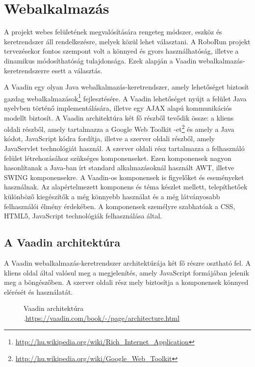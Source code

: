\section{Webalkalmazás}\label{sec:Vaadin}

	A projekt webes felületének megvalósítására rengeteg módszer, eszköz és keretrendszer áll rendelkezésre, melyek közül lehet választani. A RoboRun projekt tervezésekor fontos szempont volt a könnyed és gyors használhatóság, illetve a dinamikus módosíthatóság tulajdonsága. Ezek alapján a Vaadin webalkalmazás-keretrendszerre esett a választás.
	
	A Vaadin egy olyan Java webalkalmazás-keretrendszer, amely lehetőséget biztosít gazdag webalkalmazások\footnote{\href {http://hu.wikipedia.org/wiki/Rich\_Internet\_Application}{http://hu.wikipedia.org/wiki/Rich\_Internet\_Application}} fejlesztésére. A Vaadin lehetőséget nyújt a felület Java nyelvben történő implementálására, illetve egy AJAX alapú kommunikációs modellt biztosít. A Vaadin architektúra két fő részből tevődik össze: a kliens oldali részből, amely tartalmazza a Google Web Toolkit -et\footnote{\href {http://hu.wikipedia.org/wiki/Google\_Web\_Toolkit}{http://hu.wikipedia.org/wiki/Google\_Web\_Toolkit}} és amely a Java kódot, JavaScript kódra fordítja, illetve a szerver oldali részből, amely JavaServlet technológiát használ.
A szerver oldali rész tartalmazza a felhasználó felület létrehozásához szükséges komponenseket. Ezen komponensek nagyon hasonlítanak a Java-ban írt standard alkalmazásoknál használt AWT, illetve SWING komponensekre. A Vaadin-os komponensek is figyelőket és eseményeket használnak. Az alapértelmezett komponens és téma készlet mellett, telepíthetőek különböző kiegészítők a még könnyebb használat és a még látványosabb felhasználói élmény érdekében. A komponensek személyre szabhatóak a CSS, HTML5, JavaScript technológiák felhasználása által.

\subsection{A Vaadin architektúra}\label{sec:Vaadin architektura}

A Vaadin webalkalmazás-keretrendszer architektúrája két fő részre osztható fel. A kliens oldal által valósul meg a megjelenítés, amely JavaScript formájában jelenik meg a böngészőben. A szerver oldali rész  mely biztosítja a komponensek könnyed elérését és használatát.
\begin{figure}[h!]
  \centering
  \caption[Vaadin keretrendszer architektúrája]%
  {Vaadin architektúra\\
  {\white .}\hfill\url{https://vaadin.com/book/-/page/architecture.html}}
  \label{fig:vaadinArchitektura}
\end{figure} 

